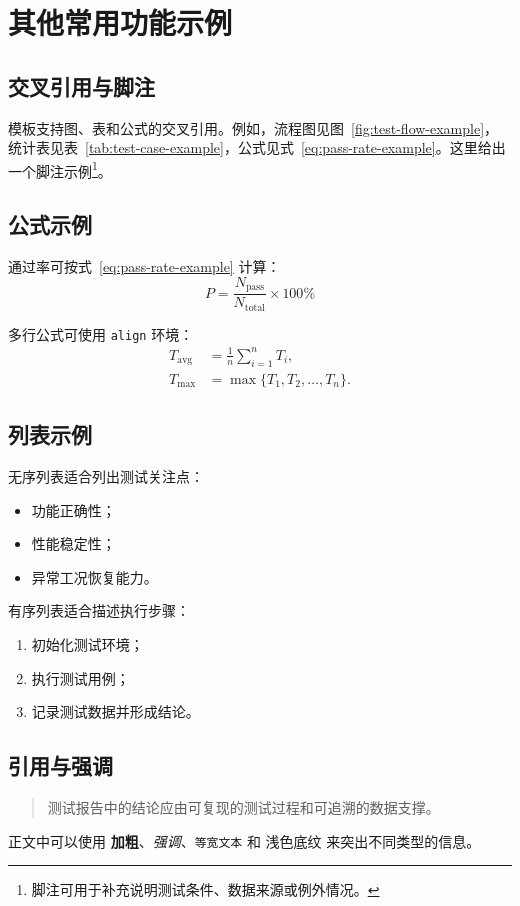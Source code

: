 \section{其他常用功能示例}

\subsection{交叉引用与脚注}
模板支持图、表和公式的交叉引用。例如，流程图见图~\ref{fig:test-flow-example}，统计表见表~\ref{tab:test-case-example}，公式见式~\eqref{eq:pass-rate-example}。这里给出一个脚注示例\footnote{脚注可用于补充说明测试条件、数据来源或例外情况。}。

\subsection{公式示例}
通过率可按式~\eqref{eq:pass-rate-example} 计算：
\begin{equation}
  P = \frac{N_{\mathrm{pass}}}{N_{\mathrm{total}}} \times 100\%
  \label{eq:pass-rate-example}
\end{equation}

多行公式可使用 \texttt{align} 环境：
\begin{align}
  T_{\mathrm{avg}} &= \frac{1}{n}\sum_{i=1}^{n} T_i, \\
  T_{\mathrm{max}} &= \max\{T_1,T_2,\ldots,T_n\}.
\end{align}

\subsection{列表示例}
无序列表适合列出测试关注点：
\begin{itemize}
  \item 功能正确性；
  \item 性能稳定性；
  \item 异常工况恢复能力。
\end{itemize}

有序列表适合描述执行步骤：
\begin{enumerate}
  \item 初始化测试环境；
  \item 执行测试用例；
  \item 记录测试数据并形成结论。
\end{enumerate}

\subsection{引用与强调}
\begin{quote}
测试报告中的结论应由可复现的测试过程和可追溯的数据支撑。
\end{quote}

正文中可以使用 \textbf{加粗}、\emph{强调}、\texttt{等宽文本} 和 \colorbox{gray!15}{浅色底纹} 来突出不同类型的信息。

